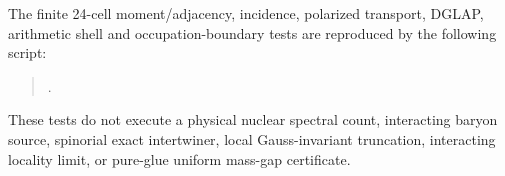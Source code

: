 \documentclass[12pt,a4paper]{article}
\begin{document}
\begin{remark}
\label{p12:rem:v350-technical-certificate-status}
The finite 24-cell moment/adjacency, incidence, polarized
transport, DGLAP, arithmetic shell and occupation-boundary
tests are reproduced by the following script:
\begin{quote}
.
\end{quote}
These tests do not execute a physical nuclear spectral count,
interacting baryon source, spinorial exact intertwiner,
local Gauss-invariant truncation, interacting locality limit,
or pure-glue uniform mass-gap certificate.
\end{remark}


\clearpage
\end{document}
